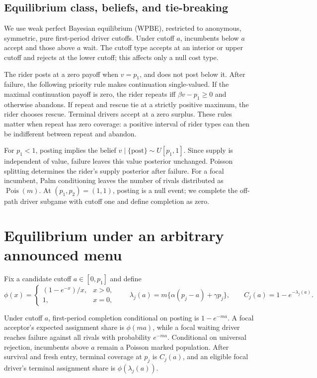 \documentclass[mnsc,dblanonrev]{informs4}
\newcommand{\ph}{\phi}
\begin{document}
\subsection{Equilibrium class, beliefs, and tie-breaking}

We use weak perfect Bayesian equilibrium (WPBE), restricted to anonymous,
symmetric, pure first-period driver cutoffs.  Under cutoff $a$, incumbents
below $a$ accept and those above $a$ wait.  The cutoff type accepts at an
interior or upper cutoff and rejects at the lower cutoff; this affects only a
null cost type.

The rider posts at a zero payoff when $v=p_1$, and does not post below it.
After failure, the following priority rule makes continuation single-valued.
If the maximal continuation payoff is zero, the rider repeats iff
$\beta v-p_1\ge0$ and otherwise abandons.  If repeat and rescue tie at a
strictly positive maximum, the rider chooses rescue.  Terminal drivers accept
at a zero surplus.  These rules matter when repeat has zero coverage: a
positive interval of rider types can then be indifferent between repeat and
abandon.

For $p_1<1$, posting implies the belief
$v\mid\{\text{post}\}\sim U[p_1,1]$.  Since supply is independent of value,
failure leaves this value posterior unchanged.  Poisson splitting determines
the rider's supply posterior after failure.  For a focal incumbent, Palm
conditioning leaves the number of rivals distributed as $\operatorname{Pois}(m)$.
At $(p_1,p_2)=(1,1)$, posting is a null event; we complete the off-path driver
subgame with cutoff one and define completion as zero.

\section{Equilibrium under an arbitrary announced menu}
\label{sec:equilibrium}

Fix a candidate cutoff $a\in[0,p_1]$ and define
\[
 \ph(x)=
 \begin{cases}(1-e^{-x})/x,&x>0,\\1,&x=0,\end{cases}
 \qquad
 \lambda_j(a)=m\{\alpha(p_j-a)+\gamma p_j\},
 \qquad C_j(a)=1-e^{-\lambda_j(a)}.
 \tag{1}
\]

\begin{lemma}
\label{lem:poisson}
Under cutoff $a$, first-period completion conditional on posting is
$1-e^{-ma}$.  A focal acceptor's expected assignment share is $\ph(ma)$,
while a focal waiting driver reaches failure against all rivals with
probability $e^{-ma}$.  Conditional on universal rejection, incumbents above
$a$ remain a Poisson marked population.  After survival and fresh entry,
terminal coverage at $p_j$ is $C_j(a)$, and an eligible focal driver's
terminal assignment share is $\ph(\lambda_j(a))$.
\end{lemma}
\end{document}
